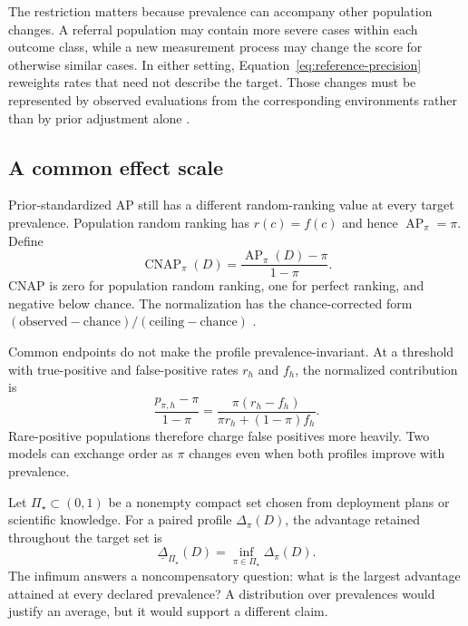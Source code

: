 \documentclass[11pt]{article}
\newcommand{\AP}{\operatorname{AP}}
\newcommand{\CNAP}{\operatorname{CNAP}}
\newcommand{\PSet}{\Pi_\star}
\theoremstyle{remark}
\begin{document}
The restriction matters because prevalence can accompany other population changes. A referral population may contain more severe cases within each outcome class, while a new measurement process may change the score for otherwise similar cases. In either setting, Equation~\eqref{eq:reference-precision} reweights rates that need not describe the target. Those changes must be represented by observed evaluations from the corresponding environments rather than by prior adjustment alone \cite{bareinboim2013transportability}.

\subsection{A common effect scale}

Prior-standardized AP still has a different random-ranking value at every target prevalence. Population random ranking has $r(c)=f(c)$ and hence $\AP_\pi=\pi$. Define
\begin{equation}
\CNAP_\pi(D)
=
\frac{\AP_\pi(D)-\pi}{1-\pi}.
\label{eq:cnap}
\end{equation}
CNAP is zero for population random ranking, one for perfect ranking, and negative below chance. The normalization has the chance-corrected form $(\text{observed}-\text{chance})/(\text{ceiling}-\text{chance})$ \cite{cohen1960coefficient}.

Common endpoints do not make the profile prevalence-invariant. At a threshold with true-positive and false-positive rates $r_h$ and $f_h$, the normalized contribution is
\begin{equation}
\frac{p_{\pi,h}-\pi}{1-\pi}
=
\frac{\pi(r_h-f_h)}
{\pi r_h+(1-\pi)f_h}.
\label{eq:threshold-cnap}
\end{equation}
Rare-positive populations therefore charge false positives more heavily. Two models can exchange order as $\pi$ changes even when both profiles improve with prevalence.

Let $\PSet\subset(0,1)$ be a nonempty compact set chosen from deployment plans or scientific knowledge. For a paired profile $\Delta_\pi(D)$, the advantage retained throughout the target set is
\begin{equation}
\underline{\Delta}_{\PSet}(D)
=
\inf_{\pi\in\PSet}\Delta_\pi(D).
\label{eq:robust-difference-generic}
\end{equation}
The infimum answers a noncompensatory question: what is the largest advantage attained at every declared prevalence? A distribution over prevalences would justify an average, but it would support a different claim.
\end{document}
